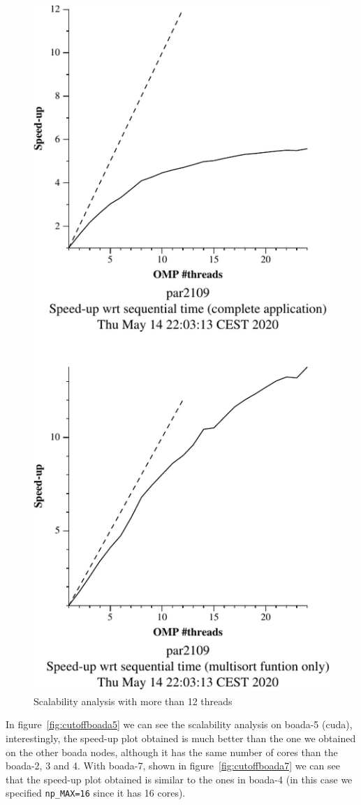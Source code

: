 \begin{figure}[H]
        \centering
        \includegraphics[width=0.35\linewidth]{plots/new-omp-tree-cutoff-24-crop.pdf}
        \caption{Scalability analysis with more than 12 threads}
        \label{fig:cutoff24} 
\end{figure}

In figure~\ref{fig:cutoffboada5} we can see the scalability analysis on boada-5 (cuda), interestingly, the speed-up
plot obtained is much better than the one we obtained on the other boada nodes, although it has the same number of
cores than the boada-2, 3 and 4. With boada-7, shown in figure~\ref{fig:cutoffboada7} we can see that the speed-up
plot obtained is similar to the ones in boada-4 (in this case we specified \texttt{np\_MAX=16} since it has 16 cores).

